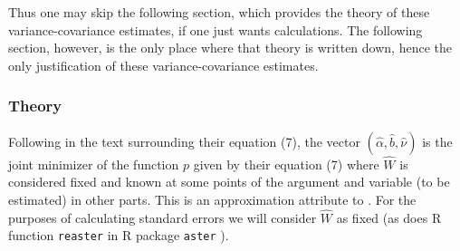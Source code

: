 \documentclass[11pt]{article}
\let\code=\texttt
\begin{document}
Thus one may skip the following section, which provides the theory of
these variance-covariance estimates, if one just wants calculations.
The following section, however, is the only place where that theory
is written down, hence the only justification of these variance-covariance
estimates.

\subsubsection{Theory}

Following \citet{reaster} in the text surrounding their equation (7),
the vector $(\hat{\alpha}, \hat{b}, \hat{\nu})$ is the joint minimizer
of the function $p$ given by their equation (7) where $\widehat{W}$ is
considered fixed and known at some points of the argument and variable
(to be estimated) in other parts.  This is an approximation
\citet{reaster} attribute to \citet{breslow-clayton}.
For the purposes of calculating standard errors we will consider
$\widehat{W}$ as fixed (as does R function \code{reaster} in R package
\code{aster} \citep{aster-package}).
\end{document}
